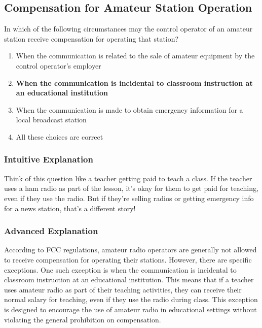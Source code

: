 \subsection{Compensation for Amateur Station Operation}
\label{T1D08}

\begin{tcolorbox}[colback=gray!10!white,colframe=black!75!black,title=T1D08]
In which of the following circumstances may the control operator of an amateur station receive compensation for operating that station?
\begin{enumerate}[label=\Alph*,noitemsep]
    \item When the communication is related to the sale of amateur equipment by the control operator's employer
    \item \textbf{When the communication is incidental to classroom instruction at an educational institution}
    \item When the communication is made to obtain emergency information for a local broadcast station
    \item All these choices are correct
\end{enumerate}
\end{tcolorbox}

\subsubsection{Intuitive Explanation}
Think of this question like a teacher getting paid to teach a class. If the teacher uses a ham radio as part of the lesson, it's okay for them to get paid for teaching, even if they use the radio. But if they're selling radios or getting emergency info for a news station, that's a different story!

\subsubsection{Advanced Explanation}
According to FCC regulations, amateur radio operators are generally not allowed to receive compensation for operating their stations. However, there are specific exceptions. One such exception is when the communication is incidental to classroom instruction at an educational institution. This means that if a teacher uses amateur radio as part of their teaching activities, they can receive their normal salary for teaching, even if they use the radio during class. This exception is designed to encourage the use of amateur radio in educational settings without violating the general prohibition on compensation.